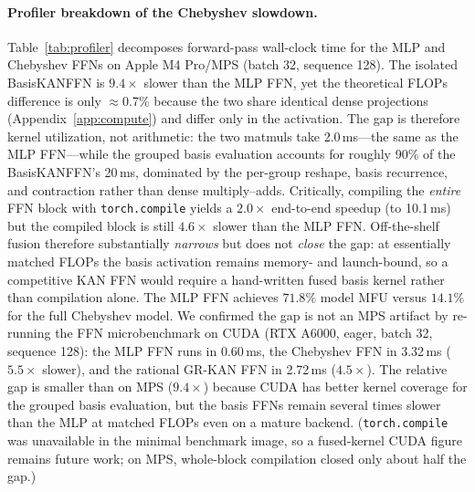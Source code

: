 \documentclass{article}
\newcommand{\modelname}[1]{\textsc{#1}}
\newcommand{\grkan}{\modelname{GR-KAN}}
\begin{document}
\paragraph{Profiler breakdown of the Chebyshev slowdown.}
Table~\ref{tab:profiler} decomposes forward-pass wall-clock time for the MLP and Chebyshev FFNs on Apple M4 Pro/MPS (batch 32, sequence 128). The isolated BasisKANFFN is \(9.4\times\) slower than the MLP FFN, yet the theoretical FLOPs difference is only \(\approx\)0.7\% because the two share identical dense projections (Appendix~\ref{app:compute}) and differ only in the activation. The gap is therefore kernel utilization, not arithmetic: the two matmuls take 2.0\,ms---the same as the MLP FFN---while the grouped basis evaluation accounts for roughly 90\% of the BasisKANFFN's 20\,ms, dominated by the per-group reshape, basis recurrence, and contraction rather than dense multiply--adds. Critically, compiling the \emph{entire} FFN block with \texttt{torch.compile} yields a \(2.0\times\) end-to-end speedup (to 10.1\,ms) but the compiled block is still \(4.6\times\) slower than the MLP FFN. Off-the-shelf fusion therefore substantially \emph{narrows} but does not \emph{close} the gap: at essentially matched FLOPs the basis activation remains memory- and launch-bound, so a competitive KAN FFN would require a hand-written fused basis kernel rather than compilation alone. The MLP FFN achieves \(71.8\%\) model MFU versus \(14.1\%\) for the full Chebyshev model. We confirmed the gap is not an MPS artifact by re-running the FFN microbenchmark on CUDA (RTX A6000, eager, batch 32, sequence 128): the MLP FFN runs in 0.60\,ms, the Chebyshev FFN in 3.32\,ms (\(5.5\times\) slower), and the rational \grkan{} FFN in 2.72\,ms (\(4.5\times\)). The relative gap is smaller than on MPS (\(9.4\times\)) because CUDA has better kernel coverage for the grouped basis evaluation, but the basis FFNs remain several times slower than the MLP at matched FLOPs even on a mature backend. (\texttt{torch.compile} was unavailable in the minimal benchmark image, so a fused-kernel CUDA figure remains future work; on MPS, whole-block compilation closed only about half the gap.)
\end{document}
